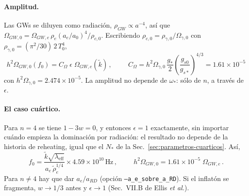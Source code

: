 \documentclass[11pt]{article}
\begin{document}
            \paragraph{Amplitud.} Las GWs se diluyen como radiación, $\rho_{GW} \propto a^{-4}$, así que $\Omega_{GW,0} = \Omega_{GW,e} \, \rho_e (a_e/a_0)^4 / \rho_{c,0}$. Escribiendo $\rho_{c,0} = \rho_{\gamma,0}/\Omega_{\gamma,0}$ con $\rho_{\gamma,0} = (\pi^2/30) \, 2 \, T_0^4$,
            \begin{equation}
                \boxed{
                h^2 \Omega_{GW,0}(f_0) = C_\Omega \; \epsilon \; \Omega_{GW,e}(\tilde k) \, ,
                \hspace{1cm}
                C_\Omega = h^2 \Omega_{\gamma,0} \, \frac{g_*}{2} \left( \frac{g_{s0}}{g_{s*}} \right)^{4/3} = 1.61 \times 10^{-5}
                }
            \end{equation}
            con $h^2\Omega_{\gamma,0} = 2.474 \times 10^{-5}$. La amplitud no depende de $\omega_*$: sólo de $n$, a través de $\epsilon$.
            \paragraph{El caso cuártico.} Para $n = 4$ se tiene $1 - 3w = 0$, y entonces $\epsilon = 1$ exactamente, sin importar cuándo empieza la dominación por radiación: el resultado no depende de la historia de reheating, igual que el $N_*$ de la Sec.~\ref{sec:parametros-cuarticos}. Así,
            \begin{equation}
                f_0 = \frac{\tilde k \sqrt{\lambda_{\text{eff}}}}{a_e \, \tilde\rho_e^{1/4}} \times 4.59 \times 10^{10}\,\text{Hz} \, ,
                \hspace{1cm}
                h^2\Omega_{GW,0} = 1.61 \times 10^{-5} \; \Omega_{GW,e} \, .
            \end{equation}
            Para $n \ne 4$ hay que dar $a_e/a_{RD}$ (opción \texttt{--a\_e\_sobre\_a\_RD}). Si el inflatón se fragmenta, $w \to 1/3$ antes y $\epsilon \to 1$ (Sec.~VII.B de Ellis \emph{et al.}).
\end{document}
